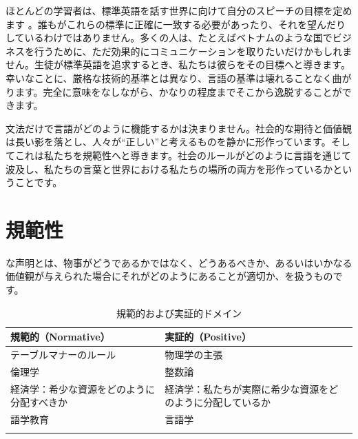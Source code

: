ほとんどの学習者は、標準英語を話す世界に向けて自分のスピーチの目標を定めます \citep[e.g.,][]{Rezaei2019}。誰もがこれらの標準に正確に一致する必要があったり、それを望んだりしているわけではありません。多くの人は、たとえばベトナムのような国でビジネスを行うために、ただ効果的にコミュニケーションを取りたいだけかもしれません。生徒が標準英語を追求するとき、私たちは彼らをその目標へと導きます。幸いなことに、厳格な技術的基準とは異なり、言語の基準は壊れることなく曲がります。完全に意味をなしながら、かなりの程度までそこから逸脱することができます。

文法だけで言語がどのように機能するかは決まりません。社会的な期待と価値観は長い影を落とし、人々が\enquote{正しい}と考えるものを静かに形作っています。そしてこれは私たちを規範性へと導きます。社会のルールがどのように言語を通じて波及し、私たちの言葉と世界における私たちの場所の両方を形作っているかということです。

\section{規範性}\label{sec:normativity}

な声明とは、物事がどうであるかではなく、どうあるべきか、あるいはいかなる価値観が与えられた場合にそれがどのようにあることが適切か、を扱うものです。

\begin{table}
        \begin{tabularx}{\textwidth}{XX}
            \lsptoprule
            規範的（Normative） & 実証的（Positive） \\
            \midrule
            テーブルマナーのルール & 物理学の主張 \\
            倫理学 & 整数論 \\
            経済学：希少な資源をどのように分配すべきか & 経済学：私たちが実際に希少な資源をどのように分配しているか \\
            語学教育 & 言語学 \\
            \lspbottomrule
        \end{tabularx}
    \caption{規範的および実証的ドメイン}
\end{table}

